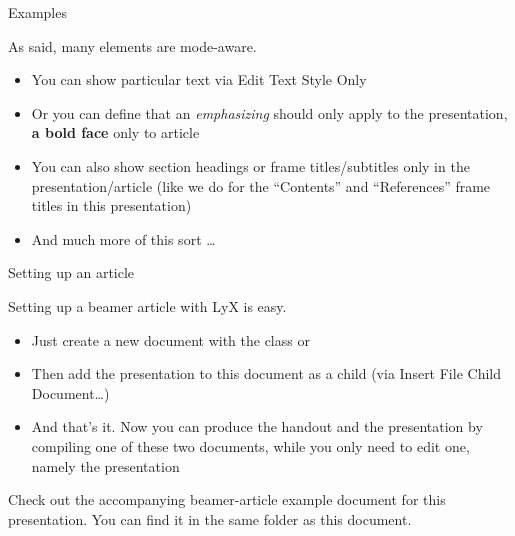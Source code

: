 \documentclass[english]{beamer}
\begin{document}
%
\begin{frame}{Examples}

As said, many elements are mode-aware. 
\begin{itemize}
\item You can show particular text 
via \alert{\noindent Edit \textrightarrow Text Style \textrightarrow Only}
\end{itemize}
\begin{itemize}
\item Or you can define that an \emph<presentation>{emphasizing} should
only apply to the presentation, \textbf<article>{a bold face} only
to article
\item You can also show section headings or frame titles\slash subtitles
only in the presentation\slash article (like we do for the ``Contents''
and ``References'' frame titles in this presentation)
\item And much more of this sort \ldots{}
\end{itemize}
\end{frame}
%
\begin{frame}{Setting up an article}

Setting up a beamer article with LyX is easy.
\begin{itemize}
\item Just create a new document with the class 
or 
\item Then add the presentation to this document as a child (via \alert{Insert \textrightarrow File \textrightarrow Child Document\ldots})
\item And that's it. Now you can produce the handout and the presentation
by compiling one of these two documents, while you only need to edit
one, namely the presentation
\end{itemize}
Check out the accompanying beamer-article example document for this
presentation. You can find it in the same folder as this document.
\end{frame}
\end{document}
